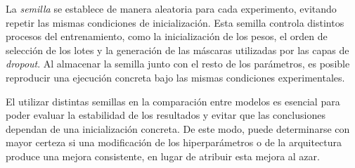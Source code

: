 La \textit{semilla} se establece de manera aleatoria para cada experimento, evitando repetir las mismas condiciones de inicialización. Esta semilla controla distintos procesos del entrenamiento, como la inicialización de los pesos, el orden de selección de los lotes y la generación de las máscaras utilizadas por las capas de \textit{dropout}. Al almacenar la semilla junto con el resto de los parámetros, es posible reproducir una ejecución concreta bajo las mismas condiciones experimentales.

El utilizar distintas semillas en la comparación entre modelos es  esencial para poder evaluar la estabilidad de los resultados y evitar que las conclusiones dependan de una inicialización concreta. De este modo, puede determinarse con mayor certeza si una modificación de los hiperparámetros o de la arquitectura produce una mejora consistente, en lugar de atribuir esta mejora al azar.
